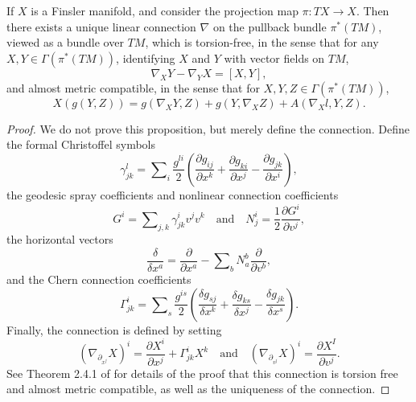 \begin{prop}
  If $X$ is a Finsler manifold, and consider the projection map $\pi: TX \to X$. Then there exists a unique linear connection $\nabla$ on the pullback bundle $\pi^*(TM)$, viewed as a bundle over $TM$, which is torsion-free, in the sense that for any $X,Y \in \Gamma(\pi^*(TM))$, identifying $X$ and $Y$ with vector fields on $TM$,
  \[ \nabla_X Y - \nabla_Y X = [X,Y], \]
  and almost metric compatible, in the sense that for $X,Y,Z \in \Gamma(\pi^*(TM))$,
  \[ X(g(Y,Z)) = g(\nabla_X Y, Z) + g(Y, \nabla_X Z) + A(\nabla_X l, Y, Z). \]
\end{prop}
\begin{proof}
  We do not prove this proposition, but merely define the connection. Define the formal Christoffel symbols
  \begin{equation}
    \gamma^l_{jk} = \sum\nolimits_i \frac{g^{li}}{2} \left( \frac{\partial g_{ij}}{\partial x^k} + \frac{\partial g_{ki}}{\partial x^j} - \frac{\partial g_{jk}}{\partial x^i} \right),
  \end{equation}
  the geodesic spray coefficients and nonlinear connection coefficients
  \begin{equation}
    G^i = \sum\nolimits_{j,k} \gamma^i_{jk} v^j v^k \quad\text{and}\quad N^i_j = \frac{1}{2} \frac{\partial G^i}{\partial v^j},
  \end{equation}
  the horizontal vectors
  \begin{equation}
    \frac{\delta}{\delta x^a} = \frac{\partial}{\partial x^a} - \sum\nolimits_b N^b_a \frac{\partial}{\partial v^b},
  \end{equation}
  and the Chern connection coefficients
  \begin{equation}
    \Gamma^i_{jk} = \sum\nolimits_s \frac{g^{is}}{2} \left( \frac{\delta g_{sj}}{\delta x^k} + \frac{\delta g_{ks}}{\delta x^j} - \frac{\delta g_{jk}}{\delta x^s} \right).
  \end{equation}
  Finally, the connection is defined by setting
  \begin{equation}
    \left(\nabla_{\partial_{x^j}} X \right)^i = \frac{\partial X^i}{\partial x^j} + \Gamma^i_{jk} X^k \quad\text{and}\quad \left( \nabla_{\partial_{v^j}} X \right)^i = \frac{\partial X^I}{\partial v^j}.
  \end{equation}
  See Theorem 2.4.1 of \cite{BaoChern} for details of the proof that this connection is torsion free and almost metric compatible, as well as the uniqueness of the connection.
\end{proof}

